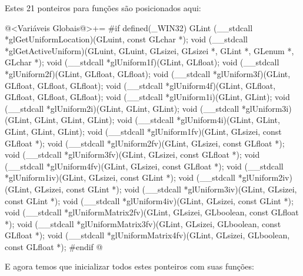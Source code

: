 Estes 21 ponteiros para funções são posicionados aqui:

\iniciocodigo
@<Variáveis Globais@>+=
#if defined(_WIN32)
GLint (__stdcall *glGetUniformLocation)(GLuint, const GLchar *);
void (__stdcall *glGetActiveUniform)(GLuint, GLuint, GLsizei, GLsizei *, GLint *,
                                     GLenum *, GLchar *);
void (__stdcall *glUniform1f)(GLint, GLfloat);
void (__stdcall *glUniform2f)(GLint, GLfloat, GLfloat);
void (__stdcall *glUniform3f)(GLint, GLfloat, GLfloat, GLfloat);
void (__stdcall *glUniform4f)(GLint, GLfloat, GLfloat, GLfloat, GLfloat);
void (__stdcall *glUniform1i)(GLint, GLint);
void (__stdcall *glUniform2i)(GLint, GLint, GLint);
void (__stdcall *glUniform3i)(GLint, GLint, GLint, GLint);
void (__stdcall *glUniform4i)(GLint, GLint, GLint, GLint, GLint);
void (__stdcall *glUniform1fv)(GLint, GLsizei, const GLfloat *);
void (__stdcall *glUniform2fv)(GLint, GLsizei, const GLfloat *);
void (__stdcall *glUniform3fv)(GLint, GLsizei, const GLfloat *);
void (__stdcall *glUniform4fv)(GLint, GLsizei, const GLfloat *);
void (__stdcall *glUniform1iv)(GLint, GLsizei, const GLint *);
void (__stdcall *glUniform2iv)(GLint, GLsizei, const GLint *);
void (__stdcall *glUniform3iv)(GLint, GLsizei, const GLint *);
void (__stdcall *glUniform4iv)(GLint, GLsizei, const GLint *);
void (__stdcall *glUniformMatrix2fv)(GLint, GLsizei, GLboolean, const GLfloat *);
void (__stdcall *glUniformMatrix3fv)(GLint, GLsizei, GLboolean, const GLfloat *);
void (__stdcall *glUniformMatrix4fv)(GLint, GLsizei, GLboolean, const GLfloat *);
#endif
@
\fimcodigo

E agora temos que inicializar todos estes ponteiros com suas funções:

